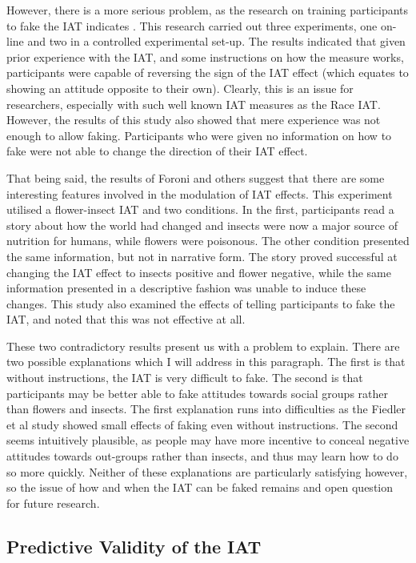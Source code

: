 However, there is a more serious problem, as the research on training participants to fake the IAT indicates \cite{Fiedler2005}. This research carried out three experiments, one on-line and two in a controlled experimental set-up. The results indicated that given prior experience with the IAT, and some instructions on how the measure works, participants were capable of reversing the sign of the IAT effect (which equates to showing an attitude opposite to their own). Clearly, this is an issue for researchers, especially with such well known IAT measures as the Race IAT. However, the results of this study also showed that mere experience was not enough to allow faking. Participants who were given no information on how to fake were not able to change the direction of their IAT effect. 

That being said, the results of Foroni and others \cite{Foroni2005}  suggest that there are some interesting features involved in the modulation of IAT effects. This experiment utilised a flower-insect IAT \cite{Greenwald1998} and two conditions. In the first, participants read a story about how the world had changed and insects were now a major source of nutrition for humans, while flowers were poisonous. The other condition presented the same information, but not in narrative form. The story proved successful at changing the IAT effect to insects positive and flower negative, while the same information presented in a descriptive fashion was unable to induce these changes. This study also examined the effects of telling participants to fake the IAT, and noted that this was not effective at all. 

These two contradictory results present us with a problem to explain. There are two possible explanations which I will address in this paragraph. The first is that without instructions, the IAT is very difficult to fake. The second is that participants may be better able to fake attitudes towards social groups rather than flowers and insects. The first explanation runs into difficulties as the Fiedler et al  study showed small effects of faking even without instructions. The second seems intuitively plausible, as people may have more incentive to conceal negative attitudes towards out-groups rather than insects, and thus may learn how to do so more quickly. Neither of these explanations are particularly satisfying however, so the issue of how and when the IAT can be faked remains and open question for future research. 

 
\subsection{Predictive Validity of the IAT}

